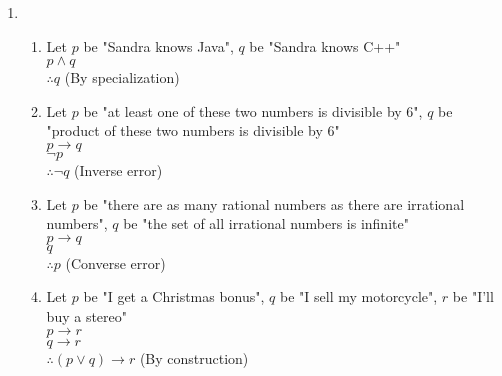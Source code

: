 \documentclass[12pt, a4paper]{article}
\begin{document}
\begin{enumerate}[Q\arabic*.]
  \item
    \begin{enumerate}[(\alph*)]
      \item Let $p$ be "Sandra knows Java", $q$ be "Sandra knows C++"\\
        $p \land q$\\
        $\therefore q$ (By specialization)
      \item Let $p$ be "at least one of these two numbers is divisible by 6", $q$ be "product of these two numbers is divisible by 6" \\
        $p \rightarrow q$\\
        $\neg p$ \\
        $\therefore \neg q$ (Inverse error)
      \item Let $p$ be "there are as many rational numbers as there are irrational numbers", $q$ be "the set of all irrational numbers is infinite" \\
        $p \rightarrow q$\\
        $q$\\
        $\therefore p$ (Converse error)
      \item Let $p$ be "I get a Christmas bonus", $q$ be "I sell my motorcycle", $r$ be "I’ll buy a stereo" \\
        $p \rightarrow r$ \\
        $q \rightarrow r$\\
        $\therefore (p \lor q) \rightarrow r$ (By construction)
    \end{enumerate}


\end{enumerate}
\end{document}

